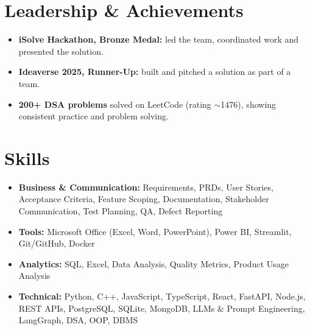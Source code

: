 \documentclass[letterpaper,10pt]{article}
\begin{document}
\section{Leadership \& Achievements}
\begin{itemize}
  \small
  \item \textbf{iSolve Hackathon, Bronze Medal:} led the team, coordinated work and presented the solution.
  \item \textbf{Ideaverse 2025, Runner-Up:} built and pitched a solution as part of a team.
  \item \textbf{200+ DSA problems} solved on LeetCode (rating $\sim$1476), showing consistent practice and problem solving.
\end{itemize}

\section{Skills}
\begin{itemize}
  \small
  \item \textbf{Business \& Communication:} Requirements, PRDs, User Stories, Acceptance Criteria, Feature Scoping, Documentation, Stakeholder Communication, Test Planning, QA, Defect Reporting
  \item \textbf{Tools:} Microsoft Office (Excel, Word, PowerPoint), Power BI, Streamlit, Git/GitHub, Docker
  \item \textbf{Analytics:} SQL, Excel, Data Analysis, Quality Metrics, Product Usage Analysis
  \item \textbf{Technical:} Python, C++, JavaScript, TypeScript, React, FastAPI, Node.js, REST APIs, PostgreSQL, SQLite, MongoDB, LLMs \& Prompt Engineering, LangGraph, DSA, OOP, DBMS
\end{itemize}
\end{document}
